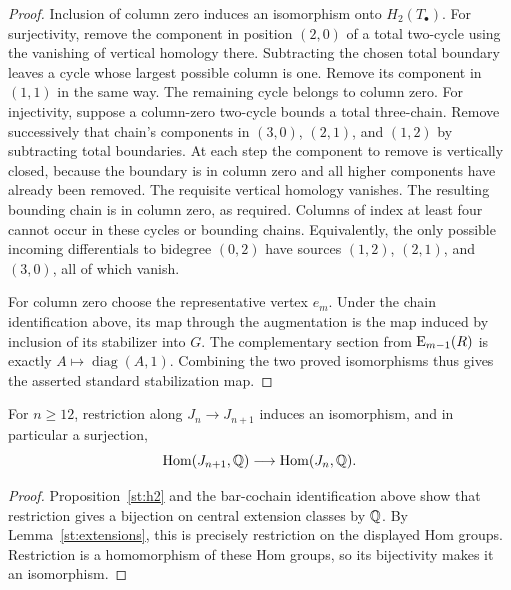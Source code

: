 \begin{proof}
Inclusion of column zero induces an isomorphism onto $H_2(T_\bullet)$.
For surjectivity, remove the component in position $(2,0)$ of a
total two-cycle using the vanishing of vertical homology there.
Subtracting the chosen total boundary leaves a cycle whose largest
possible column is one. Remove its component in $(1,1)$ in the
same way. The remaining cycle belongs to column zero.
For injectivity, suppose a column-zero two-cycle bounds a total
three-chain. Remove successively that chain's components in
$(3,0)$, $(2,1)$, and $(1,2)$ by subtracting total boundaries.
At each step the component to remove is vertically closed, because
the boundary is in column zero and all higher components have
already been removed. The requisite vertical homology vanishes.
The resulting bounding chain is in column zero, as required.
Columns of index at least four cannot occur in these cycles or
bounding chains. Equivalently, the only possible incoming
differentials to bidegree $(0,2)$ have sources $(1,2)$, $(2,1)$,
and $(3,0)$, all of which vanish.

For column zero choose the representative vertex $e_m$. Under the
chain identification above, its map through the augmentation is
the map induced by inclusion of its stabilizer into $G$.
The complementary section from $\operatorname{E}_{m-1}(R)$ is exactly
$A\mapsto\operatorname{diag}(A,1)$. Combining the two proved
isomorphisms thus gives the asserted standard stabilization map.
\end{proof}

\begin{proposition}\label{prop:rational-stability}
For $n\geq12$, restriction along $J_n\to J_{n+1}$ induces
an isomorphism, and in particular a surjection,
\[
 \operatorname{Hom}(J_{n+1},\mathbb Q)\longrightarrow\operatorname{Hom}(J_n,\mathbb Q).
\]
\end{proposition}

\begin{proof}
Proposition~\ref{st:h2} and the bar-cochain identification above
show that restriction gives a bijection on central
extension classes by $\mathbb Q$. By Lemma~\ref{st:extensions}, this
is precisely restriction on the displayed Hom groups.
Restriction is a homomorphism of these Hom groups, so its
bijectivity makes it an isomorphism.
\end{proof}
